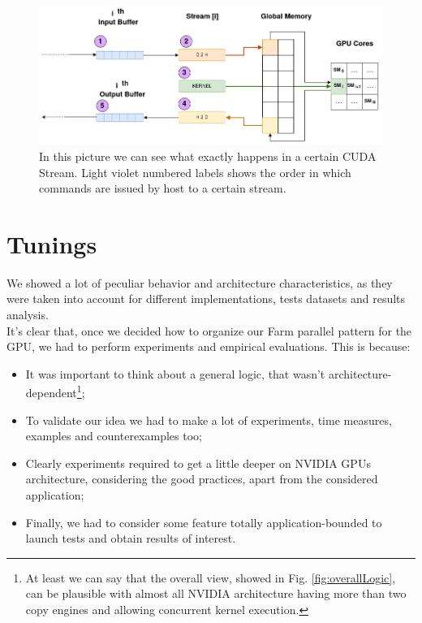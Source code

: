 	\begin{figure}%
		\includegraphics[scale=0.56]{images/singleStream.jpg}
		\caption{In this picture we can see what exactly happens in a certain CUDA Stream. Light violet numbered labels shows the order in which commands are issued by host to a certain stream.}
		\label{fig:singleStream}		
		
	\end{figure}	
\section{Tunings}
\label{sect:tunings}
	We showed a lot of peculiar behavior and architecture characteristics, as they were taken into account for different implementations, tests datasets and results analysis.\\
	It's clear that, once we decided how to organize our Farm parallel pattern for the GPU, we had to perform experiments and empirical evaluations.
	This is because:
	\begin{itemize}
		\item It was important to think about a general logic, that wasn't architecture-dependent\footnote{At least we can say that the overall view, showed in Fig. \ref{fig:overallLogic}, can be plausible with almost all NVIDIA architecture having more than two copy engines and allowing concurrent kernel execution.};
		
		\item To validate our idea we had to make a lot of experiments, time measures, examples and counterexamples too;
		
		\item Clearly experiments required to get a little deeper on NVIDIA GPUs architecture, considering the good practices, apart from the considered application;
		
		\item Finally, we had to consider some feature totally application-bounded to launch tests and obtain results of interest.
	\end{itemize}
	
